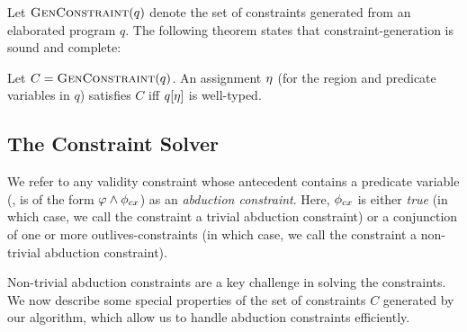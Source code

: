 %

Let $\textsc{GenConstraint}(q)$ denote the set of constraints generated from an elaborated program $q$.
The following theorem states that constraint-generation is sound and complete:
\begin{theorem}
\label{thm:constraint-generation-sc}
Let $C = \textsc{GenConstraint}(q)$.
An assignment $\eta$ (for the region and predicate variables in $q$)
satisfies $C$ iff $q[\eta]$ is well-typed.
\end{theorem}

\subsection{The Constraint Solver}

We refer to any validity constraint whose antecedent contains a predicate variable
(\ie, is of the form $\varphi \wedge \phi_{cx}$) as an \emph{abduction constraint}.
Here,  $\phi_{cx}$ is either \emph{true} (in which case, we call the constraint a trivial
abduction constraint) or a conjunction of one or more outlives-constraints (in
which case, we call the constraint a non-trivial abduction constraint).

Non-trivial abduction constraints are a key challenge in solving the constraints.
We now describe some special properties of the set of constraints $C$
generated by our algorithm, which allow us to handle abduction constraints efficiently.

